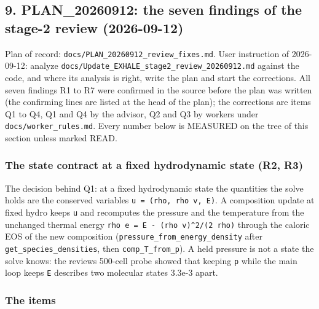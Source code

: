 \documentclass[english,a4paper]{my_memo}
\begin{document}
\subsection{9. PLAN\_20260912: the seven findings of the stage-2 review (2026-09-12)}\label{9-plan_20260912-the-seven-findings-of-the-stage-2-review-2026-09-12}

Plan of record: \texttt{docs/PLAN\_20260912\_review\_fixes.md}. User instruction of
2026-09-12: analyze \texttt{docs/Update\_EXHALE\_stage2\_review\_20260912.md} against the
code, and where its analysis is right, write the plan and start the
corrections. All seven findings R1 to R7 were confirmed in the source before
the plan was written (the confirming lines are listed at the head of the plan);
the corrections are items Q1 to Q4, Q1 and Q4 by the advisor, Q2 and Q3 by
workers under \texttt{docs/worker\_rules.md}. Every number below is MEASURED on the
tree of this section unless marked READ.

\subsubsection{The state contract at a fixed hydrodynamic state (R2, R3)}\label{the-state-contract-at-a-fixed-hydrodynamic-state-r2-r3}

The decision behind Q1: at a fixed hydrodynamic state the quantities the solve
holds are the conserved variables \texttt{u\ =\ (rho,\ rho\ v,\ E)}. A composition update
at fixed hydro keeps \texttt{u} and recomputes the pressure and the temperature from
the unchanged thermal energy \texttt{rho\ e\ =\ E\ -\ (rho\ v)\^{}2/(2\ rho)} through the
caloric EOS of the new composition (\texttt{pressure\_from\_energy\_density} after
\texttt{get\_species\_densities}, then \texttt{comp\_T\_from\_p}). A held pressure is not a state
the solve knows: the review\textquotesingle s 500-cell probe showed that keeping \texttt{p} while the
main loop keeps \texttt{E} describes two molecular states 3.3e-3 apart.

\subsubsection{The items}\label{the-items-1}
\end{document}
